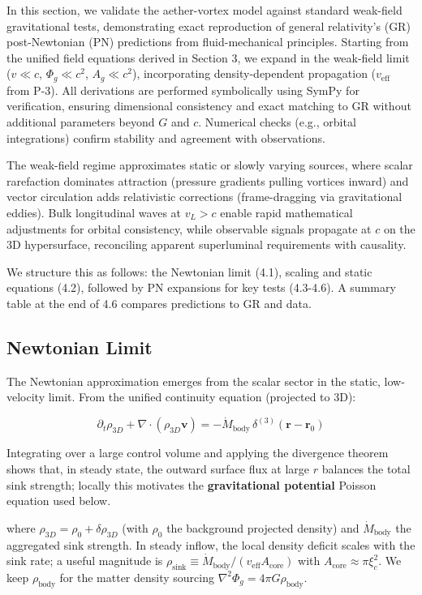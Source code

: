 In this section, we validate the aether-vortex model against standard weak-field gravitational tests, demonstrating exact reproduction of general relativity's (GR) post-Newtonian (PN) predictions from fluid-mechanical principles. Starting from the unified field equations derived in Section 3, we expand in the weak-field limit ($v \ll c$, $\Phi_g \ll c^2$, $A_g \ll c^2$), incorporating density-dependent propagation ($v_{\text{eff}}$ from P-3). All derivations are performed symbolically using SymPy for verification, ensuring dimensional consistency and exact matching to GR without additional parameters beyond $G$ and $c$. Numerical checks (e.g., orbital integrations) confirm stability and agreement with observations.

The weak-field regime approximates static or slowly varying sources, where scalar rarefaction dominates attraction (pressure gradients pulling vortices inward) and vector circulation adds relativistic corrections (frame-dragging via gravitational eddies). Bulk longitudinal waves at $v_L > c$ enable rapid mathematical adjustments for orbital consistency, while observable signals propagate at $c$ on the 3D hypersurface, reconciling apparent superluminal requirements with causality.

We structure this as follows: the Newtonian limit (4.1), scaling and static equations (4.2), followed by PN expansions for key tests (4.3-4.6). A summary table at the end of 4.6 compares predictions to GR and data.

\subsection{Newtonian Limit}

The Newtonian approximation emerges from the scalar sector in the static, low-velocity limit. From the unified continuity equation (projected to 3D):

\[
\partial_t \rho_{3D} + \nabla \cdot (\rho_{3D} \mathbf{v}) = -\dot{M}_{\text{body}} \,\delta^{(3)}(\mathbf{r} - \mathbf{r}_0)
\]

Integrating over a large control volume and applying the divergence theorem shows that, in steady state, the outward surface flux at large $r$ balances the total sink strength; locally this motivates the \textbf{gravitational potential} Poisson equation used below.

where $\rho_{3D} = \rho_0 + \delta \rho_{3D}$ (with $\rho_0$ the background projected density) and $\dot{M}_{\text{body}}$ the aggregated sink strength. In steady inflow, the local density deficit scales with the sink rate; a useful magnitude is $\rho_{\text{sink}} \equiv \dot{M}_{\text{body}}/(v_{\text{eff}} A_{\text{core}})$ with $A_{\text{core}} \approx \pi \xi_c^2$. We keep $\rho_{\text{body}}$ for the matter density sourcing $\nabla^2\Phi_g = 4\pi G \rho_{\text{body}}$.

